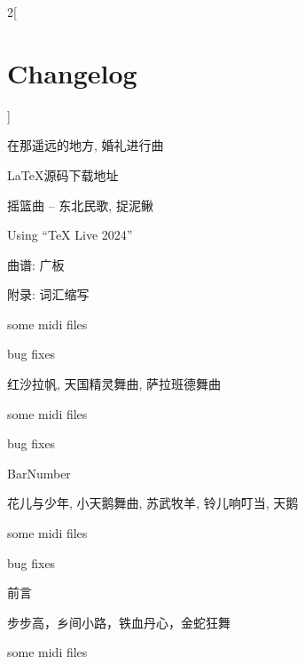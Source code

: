{\begin{multicols*}{2}[\section*{Changelog}]
\begin{changelog}[author=李小丹, section=false]
\begin{version}[v=3.6-$\beta$(3.1415), date=2024-06-14]
	\added
		\item 在那遥远的地方, 婚礼进行曲
		\item \LaTeX{}源码下载地址
\end{version}
\begin{version}[v=3.5-$\beta$(3.1415), date=2024-04-03]
	\added
		\item 摇篮曲 -- 东北民歌, 捉泥鳅
	\changed
		\item Using ``TeX Live 2024''
\end{version}
\begin{version}[v=3.4-$\beta$(3.1415), date=2024-02-27]
	\added
		\item 曲谱: 广板
		\item 附录: 词汇缩写
		\item some midi files
	\fixed
		\item bug fixes
\end{version}
\begin{version}[v=3.3-$\beta$(3.1415), date=2024-02-07]
	\added
		\item 红沙拉帆, 天国精灵舞曲, 萨拉班德舞曲
		\item some midi files
	\fixed
		\item bug fixes
	\changed
		\item BarNumber
\end{version}
\begin{version}[v=3.2-$\beta$(3.1415), date=2024-01-04]
	\added
		\item 花儿与少年, 小天鹅舞曲, 苏武牧羊, 铃儿响叮当, 天鹅
		\item some midi files
	\fixed
		\item bug fixes
	\changed
		\item 前言
\end{version}
\begin{version}[v=3.1-$\beta$(3.1415), date=2023-12-28]
	\added
		\item 步步高，乡间小路，铁血丹心，金蛇狂舞
		\item some midi files
\end{version}
\begin{version}[v=3.0-$\beta$(3.1415), date=2023-12-22]

\end{version}
\end{changelog}
\end{multicols*}}
